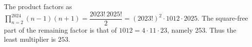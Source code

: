The product factors as $\prod_{n=2}^{2024}(n-1)(n+1)=\dfrac{2023!\,2025!}{2}=(2023!)^2\cdot1012\cdot2025$. The square-free part of the remaining factor is that of $1012=4\cdot11\cdot23$, namely 253. Thus the least multiplier is $\boxed{253}$.

